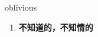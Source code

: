 
\begin{frame}
{\huge oblivious}
\begin{center}
\begin{enumerate}\Large
  \item \textbf{不知道的，不知情的}
\end{enumerate}
\end{center}
\end{frame}
